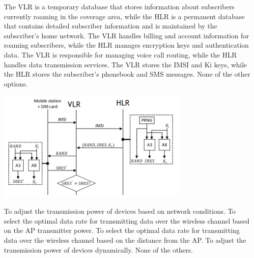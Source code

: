 \begin{questions}

    \begin{checkboxes}
        \CorrectChoice The VLR is a temporary database that stores information about subscribers currently roaming in the coverage area, while the HLR is a permanent database that contains detailed subscriber information and is maintained by the subscriber's home network.
        \choice The VLR handles billing and account information for roaming subscribers, while the HLR manages encryption keys and authentication data.
        \choice The VLR is responsible for managing voice call routing, while the HLR handles data transmission services.
        \choice The VLR stores the IMSI and Ki keys, while the HLR stores the subscriber's phonebook and SMS messages.
        \choice None of the other options.
    \end{checkboxes}


    \begin{solution}
        \center
        \includegraphics[width=0.7\textwidth]{images/GSM_auth.png}
    \end{solution}




    \begin{checkboxes}
        \choice To adjust the transmission power of devices based on network conditions.
        \choice To select the optimal data rate for transmitting data over the wireless channel based on the AP transmitter power.
        \choice To select the optimal data rate for transmitting data over the wireless channel based on the distance from the AP.
        \choice To adjust the transmission power of devices dynamically.
        \CorrectChoice None of the others.
    \end{checkboxes}


\end{questions}
